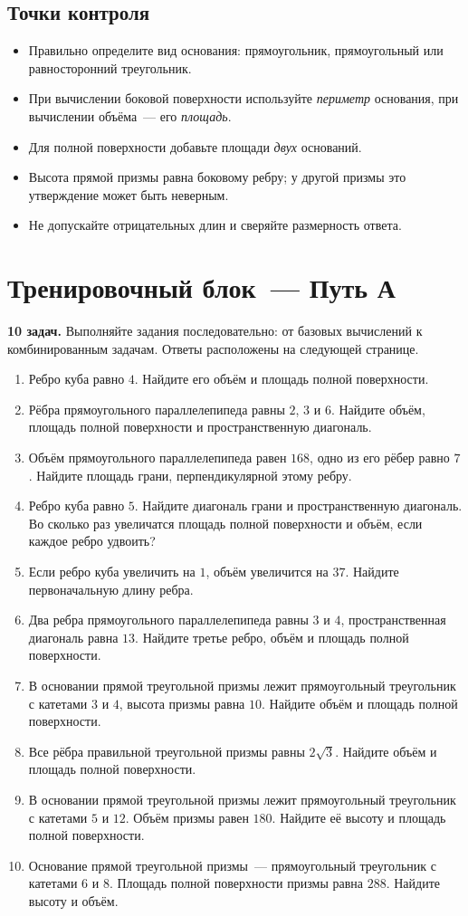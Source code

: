 \documentclass[a4paper,11pt]{article}
\begin{document}
\subsection*{Точки контроля}
\begin{itemize}
\item Правильно определите вид основания: прямоугольник, прямоугольный или равносторонний треугольник.
\item При вычислении боковой поверхности используйте \emph{периметр} основания, при вычислении объёма~--- его \emph{площадь}.
\item Для полной поверхности добавьте площади \emph{двух} оснований.
\item Высота прямой призмы равна боковому ребру; у другой призмы это утверждение может быть неверным.
\item Не допускайте отрицательных длин и сверяйте размерность ответа.
\end{itemize}

\clearpage
\section*{Тренировочный блок~--- Путь А}
\textcolor{darkaccent}{\bfseries 10 задач.} Выполняйте задания последовательно: от базовых вычислений к комбинированным задачам. Ответы расположены на следующей странице.

\begin{enumerate}
\item Ребро куба равно $4$. Найдите его объём и площадь полной поверхности.
\item Рёбра прямоугольного параллелепипеда равны $2$, $3$ и $6$. Найдите объём, площадь полной поверхности и пространственную диагональ.
\item Объём прямоугольного параллелепипеда равен $168$, одно из его рёбер равно $7$. Найдите площадь грани, перпендикулярной этому ребру.
\item Ребро куба равно $5$. Найдите диагональ грани и пространственную диагональ. Во сколько раз увеличатся площадь полной поверхности и объём, если каждое ребро удвоить?
\item Если ребро куба увеличить на $1$, объём увеличится на $37$. Найдите первоначальную длину ребра.
\item Два ребра прямоугольного параллелепипеда равны $3$ и $4$, пространственная диагональ равна $13$. Найдите третье ребро, объём и площадь полной поверхности.
\item В основании прямой треугольной призмы лежит прямоугольный треугольник с катетами $3$ и $4$, высота призмы равна $10$. Найдите объём и площадь полной поверхности.
\item Все рёбра правильной треугольной призмы равны $2\sqrt3$. Найдите объём и площадь полной поверхности.
\item В основании прямой треугольной призмы лежит прямоугольный треугольник с катетами $5$ и $12$. Объём призмы равен $180$. Найдите её высоту и площадь полной поверхности.
\item Основание прямой треугольной призмы~--- прямоугольный треугольник с катетами $6$ и $8$. Площадь полной поверхности призмы равна $288$. Найдите высоту и объём.
\end{enumerate}
\end{document}
